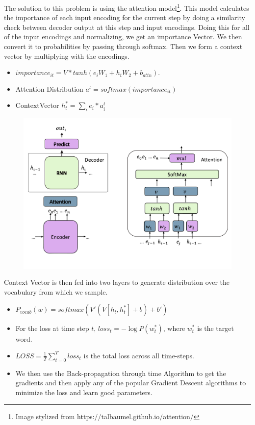 \documentclass{article} %
\begin{document}
  The solution to this problem is using the attention model\footnote{Image stylized from https://talbaumel.github.io/attention/}. This model calculates the importance of each input encoding for the current step by doing a similarity check between decoder output at this step and input encodings. Doing this for all of the input encodings and normalizing, we get an importance Vector. We then convert it to probabilities by passing through softmax. Then we form a context vector by multiplying with the encodings.
  \begin{itemize}
      
      \item $importance_{it} = V* tanh(e_iW_1+h_tW_2+b_{attn})$.
      \item Attention Distribution $a^t = softmax(importance_{it})$
      \item  ContextVector $ h^{*}_t = \sum_i e_i*a^t_i$
      
  \end{itemize}
  \begin{figure}[!h]
  \centering
  \includegraphics[width=0.8\linewidth]{7.pdf}\\
  \end{figure}
Context Vector is then fed into two layers to generate distribution over the vocabulary from which we sample.
  \begin{itemize}
    \item $P_{vocab}(w) = softmax(V'(V[h_t,h_t^*] + b) + b')$
    \item For the loss at time step $t$, $loss_t = -\log P(w_t^*)$, where $w_t^*$ is the target word.
    \item $LOSS = \frac{1}{T} \sum_{t=0}^{T} loss_t$ is the total loss across all time-steps.
    \item We then use the Back-propagation through time Algorithm to get the gradients and then apply any of the popular Gradient Descent algorithms to minimize the loss and learn good parameters.
\end{itemize}
\end{document}
